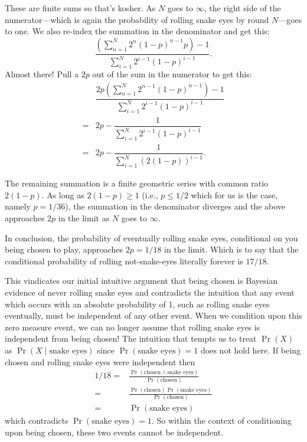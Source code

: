 \documentclass[article,twocolumn]{memoir}
\begin{document}
These are finite sums so that's kosher.
As $N$ goes to $\infty$, the right side of the numerator---which is again the probability of rolling snake eyes by round $N$---goes to one.
We also re-index the summation in the denominator and get this:
$$
\dfrac{
\left(\sum\limits_{n=1}^{N}2^n(1-p)^{n-1}p\right) - 1
}
{\sum\limits_{i=1}^{N}2^{i-1}(1-p)^{i-1}}.
$$
Almost there!
Pull a $2p$ out of the sum in the numerator to get this:
\begin{equation*}
\begin{split}
& \dfrac{
2p\left(\sum\limits_{n=1}^{N}2^{n-1}(1-p)^{n-1}\right) - 1
}
{\sum\limits_{i=1}^{N}2^{i-1}(1-p)^{i-1}} \\
= & 2p - \dfrac{1} 
{\sum\limits_{i=1}^{N}2^{i-1}(1-p)^{i-1}} \\
= & 2p - \dfrac{1} 
{\sum\limits_{i=1}^{N}\left(2(1-p)\right)^{i-1}}.
\end{split}
\end{equation*}

The remaining summation is a finite geometric series with common ratio $2(1-p)$.
As long as $2(1-p) \geq 1$ (i.e., $p\leq 1/2$ which for us is the case, namely $p=1/36$), the summation in the denominator diverges and the above approaches $2p$ in the limit as $N$ goes to $\infty$.

In conclusion, the probability of eventually rolling snake eyes, conditional on you being chosen to play, approaches $2p=1/18$ in the limit.
Which is to say that the conditional probability of rolling not-snake-eyes literally forever is $17/18$.

This vindicates our initial intuitive argument that being chosen is Bayesian evidence of never rolling snake eyes and contradicts the intuition that any event which occurs with an absolute probability of 1, such as rolling snake eyes eventually, must be independent of any other event.
When we condition upon this zero measure event, we can no longer assume that rolling snake eyes is independent from being chosen!
The intuition that tempts us to treat $\Pr(X)$ as $\Pr(X \mid \text{snake eyes})$ since $\Pr(\text{snake eyes}) = 1$ does not hold here.
If being chosen and rolling snake eyes were independent then 
\begin{align*}
  1/18 = & \frac{\Pr(\text{chosen} \land \text{snake eyes})}{\Pr(\text{chosen})}\\
       = & \frac{\Pr(\text{chosen})\Pr(\text{snake eyes})}{\Pr(\text{chosen})}\\
       = & \Pr(\text{snake eyes}) 
\end{align*}
which contradicts $\Pr(\text{snake eyes}) = 1$.
So within the context of conditioning upon being chosen, these two events cannot be independent.
\end{document}
